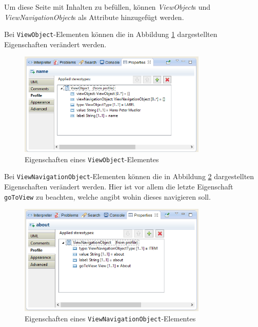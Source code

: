 Um diese Seite mit Inhalten zu befüllen, können \textit{ViewObject}s und 
\textit{ViewNavigationObject}s als Attribute hinzugefügt werden.

\newpage
Bei \texttt{ViewObject}-Elementen können die in Abbildung \ref{Fig:ViewProp}
dargestellten Eigenschaften verändert werden.

\begin{figure}[htbp]
\begin{center}
\includegraphics[width=0.8\textwidth]{./img/Prop-ViewObjects.png}
\caption{Eigenschaften eines \texttt{ViewObject}-Elementes }\label{Fig:ViewProp}
\end{center}
\end{figure} 

Bei \texttt{ViewNavigationObject}-Elementen können die in Abbildung
\ref{Fig:ViewNavProp} dargestellten Eigenschaften verändert werden. Hier ist
vor allem die letzte Eigenschaft \texttt{goToView} zu beachten, welche angibt
wohin dieses navigieren soll.

\begin{figure}[htbp]
\begin{center}
\includegraphics[width=0.8\textwidth]{./img/Prop-ViewNavigationObjects.png}
\caption{Eigenschaften eines \texttt{ViewNavigationObject}-Elementes
}\label{Fig:ViewNavProp}
\end{center}
\end{figure}
